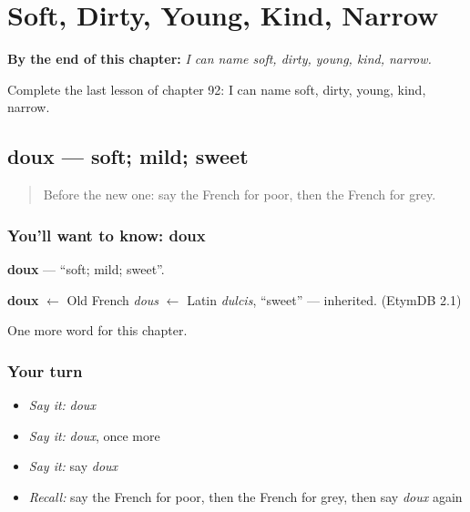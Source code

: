 
\chapter{Soft, Dirty, Young, Kind, Narrow}
\label{ch:fr-soft-dirty-young-kind-narrow}

\begin{chapteropening}
\textbf{By the end of this chapter:} \emph{I can name soft, dirty, young, kind, narrow.}

Complete the last lesson of chapter 92: I can name soft, dirty, young, kind, narrow.
\end{chapteropening}

\section[doux]{doux — soft; mild; sweet}

\label{lesson:FR-C92-doux}



\begin{quote}
Before the new one: say the French for poor, then the French for grey.
\end{quote}

\subsection*{You'll want to know: doux}
\textbf{doux} — \textquotedblleft{}soft; mild; sweet\textquotedblright{}.

\begin{cousinweb}
\textbf{doux} $\leftarrow$ Old French \emph{dous} $\leftarrow$ Latin \emph{dulcis}, \textquotedblleft{}sweet\textquotedblright{} — inherited. (EtymDB 2.1)
\end{cousinweb}

\begin{grammarlens}[title={What you've built}]
One more word for this chapter.
\end{grammarlens}

\subsection*{Your turn}
\begin{itemize}
\raggedright
  \item \emph{Say it:} \emph{doux}
  \item \emph{Say it:} \emph{doux}, once more
  \item \emph{Say it:} say \emph{doux}
  \item \emph{Recall:} say the French for poor, then the French for grey, then say \emph{doux} again
\end{itemize}

